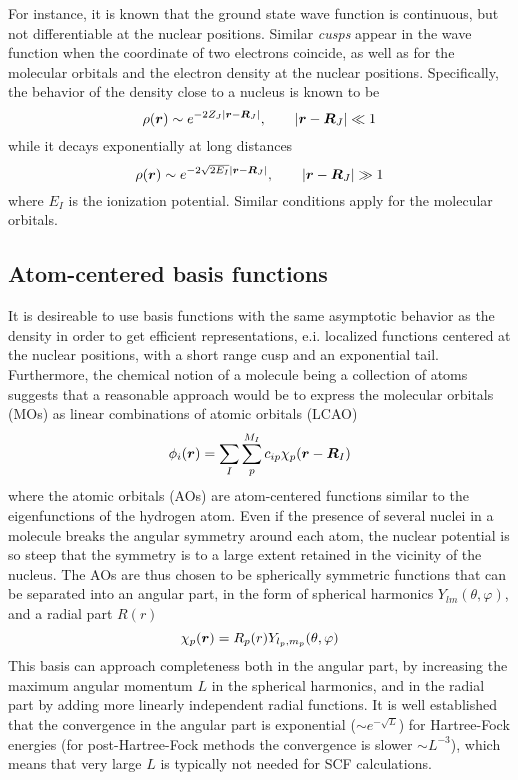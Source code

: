 For instance, it is known that the ground state wave function is continuous, but not differentiable 
at the nuclear positions\cite{Kato:1957}.
Similar \emph{cusps} appear in the wave function when the coordinate of two electrons coincide, 
as well as for the molecular orbitals and the electron density at the nuclear positions. 
Specifically, the behavior of the density close to a nucleus is known to be
\begin{equation}
    \rho(\boldsymbol r) \sim e^{-2Z_J|\boldsymbol r-\boldsymbol R_J|}, \qquad |\boldsymbol r-\boldsymbol R_J| \ll 1
\end{equation}
while it decays exponentially at long distances 
\begin{equation}
    \rho(\boldsymbol r) \sim e^{-2\sqrt{2E_I}|\boldsymbol r-\boldsymbol R_J|}, \qquad |\boldsymbol r - \boldsymbol R_J| \gg 1
\end{equation}
where $E_I$ is the ionization potential. Similar conditions apply for the molecular orbitals.

\subsection{Atom-centered basis functions}
It is desireable to use basis functions with the same asymptotic behavior as the density in order 
to get efficient representations, e.i. localized functions centered at the nuclear positions, with 
a short range cusp and an exponential tail. Furthermore, the chemical notion of a molecule being 
a collection of atoms suggests that a reasonable approach would be to express the molecular orbitals 
(MOs) as linear combinations of atomic orbitals (LCAO)
\begin{equation}
    \phi_i(\boldsymbol r) = \sum_I\sum_p^{M_I} c_{ip}\chi_p(\boldsymbol r-\boldsymbol R_I) 
\end{equation}
where the atomic orbitals (AOs) are atom-centered functions similar to the eigenfunctions of the 
hydrogen atom. Even if the presence of several nuclei in a molecule breaks the angular symmetry
around each atom, the nuclear potential is so steep that the symmetry is to a large extent retained
in the vicinity of the nucleus. The AOs are thus chosen to be spherically symmetric functions that 
can be separated into an angular part, in the form of spherical harmonics $Y_{lm}(\theta,\varphi)$, 
and a radial part $R(r)$
\begin{equation}
    \chi_p (\boldsymbol r) = R_p(r)Y_{l_p,m_p}(\theta,\varphi)
\end{equation}
This basis can approach completeness both in the angular part, by increasing the maximum angular 
momentum $L$ in the spherical harmonics, and in the radial part by adding more linearly independent
radial functions. It is well established that the convergence in the angular part is exponential
($\sim e^{-\sqrt{L}}$) for Hartree-Fock energies (for post-Hartree-Fock methods the convergence is 
slower $\sim L^{-3}$), which means that very large $L$ is typically not needed for SCF calculations. 

